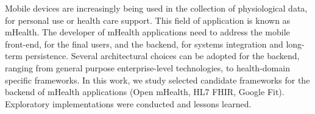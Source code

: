 \documentclass[11pt,twoside,a4paper]{report}
\begin{document}
\TitlePage
  \vspace*{55mm}
  \vspace*{10mm}
       { Mobile devices are increasingly being used in the collection of physiological data, for personal use or health care support. This field of application is known as mHealth. The developer of mHealth applications need to address the mobile front-end, for the final users, and the backend, for systems integration and long-term persistence. Several architectural choices can be adopted for the backend, ranging from general purpose enterprise-level technologies, to health-domain specific frameworks. In this work, we study selected candidate frameworks for the backend of mHealth applications (Open mHealth, HL7 FHIR, Google Fit). Exploratory implementations were conducted and lessons learned.}
\EndTitlePage
\titlepage\ \endtitlepage %


%
%


\tableofcontents

\cleardoublepage
\listoffigures

\cleardoublepage
\listoftables

\cleardoublepage


\printglossary[style=mcolindex,title=Lista de Abrevia\c c\~oes e Acr\'onimos, nonumberlist]


\end{document}
